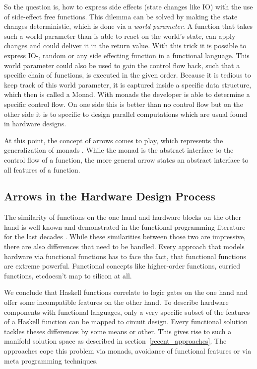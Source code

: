 \documentclass[11pt,final,a4paper]{article}
\begin{document}
So the question is, how to express side effects (state changes like IO) with the use of side-effect free functions. This dilemma can be solved
by making the state changes deterministic, which is done via a \emph{world parameter}. A function that takes such a world parameter than
is able to react on the world's state, can apply changes and could deliver it in the return value. With this trick it is possible to express
IO-, random or any side effecting function in a functional language. This world parameter could also be used to gain the control flow back,
such that a specific chain of functions, is executed in the given order. Because it is tedious to keep track of this world parameter, it is
captured inside a specific data structure, which then is called a Monad. With monads the developer is able to determine a specific control
flow. On one side this is better than no control flow but on the other side it is to specific to design parallel computations which are
usual found in hardware designs. 

At this point, the concept of arrows comes to play, which represents the generalization of monads \cite{Hughes98generalisingmonads}. While
the monad is the abstract interface to the control flow of a function, the more general arrow states an abstract interface to all features
of a function.

\subsection{Arrows in the Hardware Design Process}
The similarity of functions on the one hand and hardware blocks on the other hand is well known and demonstrated in the functional
programming literature for the last decades \cite{sheeran:perfect_match,donnell}. While these similarities between those two are impressive,
there are also differences that need to be handled. Every approach that models hardware via functional functions has to face the fact, that
functional functions are extreme powerful. Functional concepts like higher-order functions, curried functions, etc\. doesn't map to silicon at
all. 

We conclude that Haskell functions correlate to logic gates on the one hand and offer some incompatible features on the other hand. To
describe hardware components with functional languages, only a very specific subset of the features of a Haskell function can be mapped to
circuit design. Every functional solution tackles theses differences by some means or other. This gives rise to such a manifold solution
space as described in section~\ref{recent_approaches}. The approaches cope this problem via monads, avoidance of functional features or via
meta programming techniques. 
\end{document}
